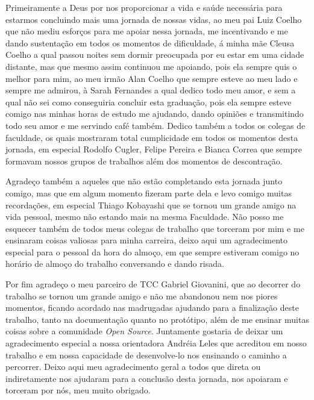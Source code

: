 \begin{agradecimentos}
Primeiramente a Deus por nos proporcionar a vida e saúde necessária para estarmos concluindo mais uma jornada de nossas vidas, ao meu pai Luiz Coelho que não mediu esforços para me apoiar nessa jornada, me incentivando e me dando sustentação em todos os momentos de dificuldade, á minha mãe Cleusa Coelho a qual passou noites sem dormir preocupada por eu estar em uma cidade distante, mas que mesmo assim continuou me apoiando, pois ela sempre quis o melhor para mim, ao meu irmão Alan Coelho que sempre esteve ao meu lado e sempre me admirou, à Sarah Fernandes a qual dedico todo meu amor, e sem a qual não sei como conseguiria concluir esta graduação, pois ela sempre esteve comigo nas minhas horas de estudo me ajudando, dando opiniões e transmitindo todo seu amor e me servindo café também. Dedico também a todos os colegas de faculdade, os quais mostraram total cumplicidade em todos os momentos desta jornada, em especial Rodolfo Cugler, Felipe Pereira e Bianca Correa que sempre formavam nossos grupos de trabalhos além dos momentos de descontração.

Agradeço também a aqueles que não estão completando esta jornada junto comigo, mas que em algum momento fizeram parte dela e levo comigo muitas recordações, em especial Thiago Kobayashi que se tornou um grande amigo na vida pessoal, mesmo não estando mais na mesma Faculdade. Não posso me esquecer também de todos meus colegas de trabalho que torceram por mim e me ensinaram coisas valiosas para minha carreira, deixo aqui um agradecimento especial para o pessoal da hora do almoço, em que sempre estiveram comigo no horário de almoço do trabalho conversando e dando risada.

Por fim agradeço o meu parceiro de TCC Gabriel Giovanini, que ao decorrer do trabalho se tornou um grande amigo e não me abandonou nem nos piores momentos, ficando acordado nas madrugadas ajudando para a finalização deste trabalho, tanto na documentação quanto no protótipo, além de me ensinar muitas coisas sobre a comunidade \textit{Open Source}. Juntamente gostaria de deixar um agradecimento especial a nossa orientadora Andréia Leles que acreditou em nosso trabalho e em nossa capacidade de desenvolve-lo nos ensinando o caminho a percorrer. Deixo aqui meu agradecimento geral a todos que direta ou indiretamente nos ajudaram para a conclusão desta jornada, nos apoiaram e torceram por nós, meu muito obrigado.
\end{agradecimentos}